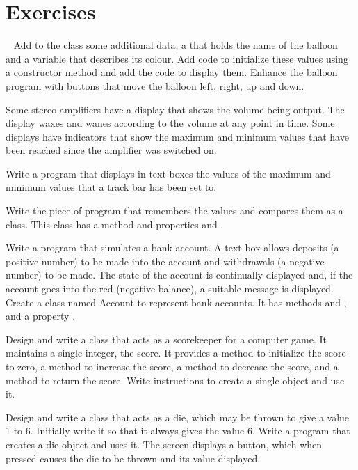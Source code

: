 	\section{Exercises}
		\begin{EXE}
			\item  Add to the class  some additional data, a  that holds the name of the balloon and a variable that describes its colour. Add code to initialize these values using a constructor method and add the code to display them.
		Enhance the balloon program with buttons that move the balloon left, right, up and down.
			\item {} Some stereo amplifiers have a display that shows the volume being output. The display waxes and wanes according to the volume at any point in time. Some displays have indicators that show the maximum and minimum values that have been reached since the amplifier was switched on.
				
				Write a program that displays in text boxes the values of the maximum and minimum values that a track bar has been set to.
				
				Write the piece of program that remembers the values and compares them as a class. This class has a method  and properties  and .
			\item {} Write a program that simulates a bank account. A text box allows deposits (a positive number) to be made into the account and withdrawals (a negative number) to be made. The state of the account is continually displayed and, if the account goes into the red (negative balance), a suitable message is displayed. Create a class named Account to represent bank accounts. It has methods  and , and a property .
			\item {} Design and write a class that acts as a scorekeeper for a computer game. It maintains a single integer, the score. It provides a method to initialize the score to zero, a method to increase the score, a method to decrease the score, and a method to return the score. Write instructions to create a single object and use it.
			\item {} Design and write a class that acts as a die, which may be thrown to give a value 1 to 6. Initially write it so that it always gives the value 6. Write a program that creates a die object and uses it. The screen displays a button, which when pressed causes the die to be thrown and its value displayed.


\end{EXE}
